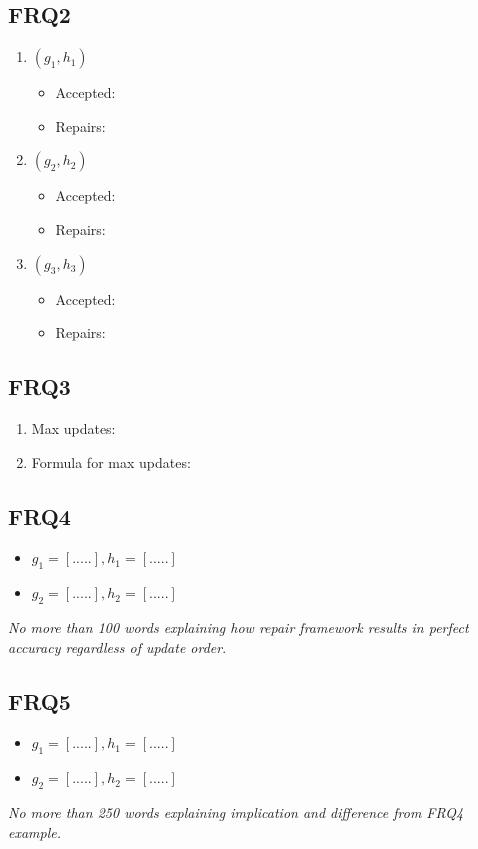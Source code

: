 \documentclass[a4paper,10pt]{article}
\begin{document}
\subsection*{FRQ2}
\begin{enumerate}
    \item $(g_{1}, h_{1})$
    \begin{itemize}
        \item Accepted: %
        \item Repairs:  %
    \end{itemize}
    \item $(g_{2}, h_{2})$
    \begin{itemize}
        \item Accepted: %
        \item Repairs:  %
    \end{itemize}
    \item $(g_{3}, h_{3})$
    \begin{itemize}
        \item Accepted: %
        \item Repairs:  %
    \end{itemize}
\end{enumerate}

\subsection*{FRQ3}
\begin{enumerate}
    \item Max updates: %
    \item Formula for max updates: %
\end{enumerate}
\subsection*{FRQ4}
\begin{itemize}
    \item $g_{1} = [. . . . .], h_{1} = [. . . . .]$
    \item $g_{2} = [. . . . .], h_{2} = [. . . . .]$
\end{itemize}
\textit{No more than 100 words explaining how repair framework results in perfect accuracy regardless of update order}.
\subsection*{FRQ5}
\begin{itemize}
    \item $g_{1} = [. . . . .], h_{1} = [. . . . .]$
    \item $g_{2} = [. . . . .], h_{2} = [. . . . .]$
\end{itemize}
\textit{No more than 250 words explaining implication and difference from FRQ4 example.}
\end{document}
